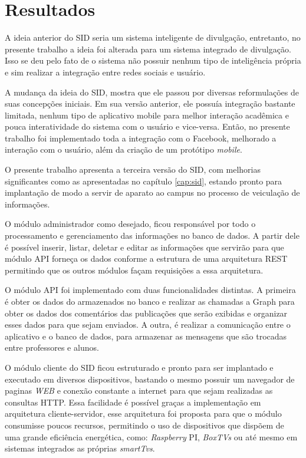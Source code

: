 \chapter[Resultados]{Resultados}
A ideia anterior do SID seria um sistema inteligente de divulgação, entretanto, no presente trabalho a ideia foi alterada para um sistema integrado de divulgação. Isso se deu pelo fato de o sistema não possuir nenhum tipo de inteligência própria e sim realizar a integração entre redes sociais e usuário.

A mudança da ideia do SID, mostra que ele passou por diversas reformulações de suas concepções iniciais. Em sua versão anterior, ele possuía integração bastante limitada, nenhum tipo de aplicativo mobile para melhor interação acadêmica e pouca interatividade do sistema com o usuário e vice-versa. Então, no presente trabalho foi implementado toda a integração com o Facebook, melhorado a interação com o usuário, além da criação de um protótipo \textit{mobile}.

O presente trabalho apresenta a terceira versão do SID, com melhorias significantes como as apresentadas no capítulo \ref{cap:sid}, estando pronto para implantação de modo a servir de aparato ao campus no processo de veiculação de informações.

O módulo administrador como desejado, ficou responsável por todo o processamento e gerenciamento das informações no banco de dados. A partir dele é possível inserir, listar, deletar e editar as informações que servirão para que módulo API forneça os dados conforme a estrutura de uma arquitetura REST permitindo que os outros módulos façam requisições a essa arquitetura.

O módulo API foi implementado com duas funcionalidades distintas. A primeira é obter os dados do armazenados no banco e realizar as chamadas a Graph para obter os dados dos comentários das publicações que serão exibidas e organizar esses dados para que sejam enviados. A outra, é realizar a comunicação entre o aplicativo e o banco de dados, para armazenar as mensagens que são trocadas entre professores e alunos.

O módulo cliente do SID ficou estruturado e pronto para ser implantado e executado em diversos dispositivos, bastando o mesmo possuir um navegador de paginas \textit{WEB} e conexão constante a internet para que sejam realizadas as consultas HTTP. Essa facilidade é possível graças a implementação em arquitetura cliente-servidor, esse arquitetura foi proposta para que o módulo consumisse poucos recursos, permitindo o uso de dispositivos que dispõem de uma grande eficiência energética, como: \textit{Raspberry} PI, \textit{BoxTVs} ou até mesmo em sistemas integrados as próprias \textit{smartTvs}.

